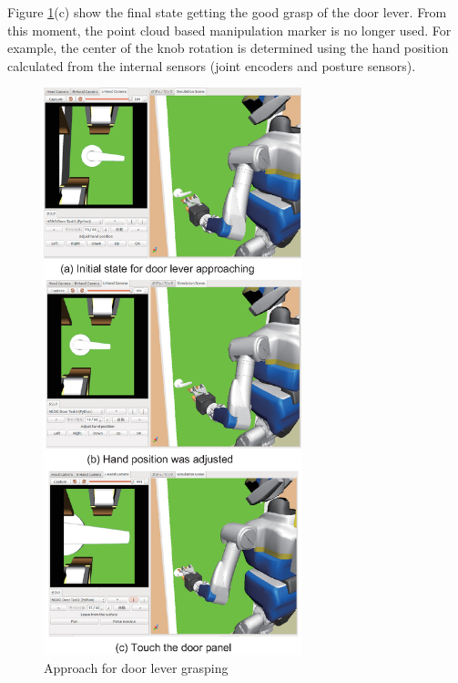 Figure \ref{fig:door_lever_grasp}(c) show the final state getting the good grasp of the door lever. From this moment, the point cloud based manipulation marker is no longer used. For example, the center of the knob rotation is determined using the hand position calculated from the internal sensors (joint encoders and posture sensors). 
%
\begin{figure}[t]
  \centering
  \includegraphics[width = 7.5cm]{img/approach_door_lever.eps}
  \caption{Approach for door lever grasping}
  \label{fig:door_lever_grasp}
\end{figure}


